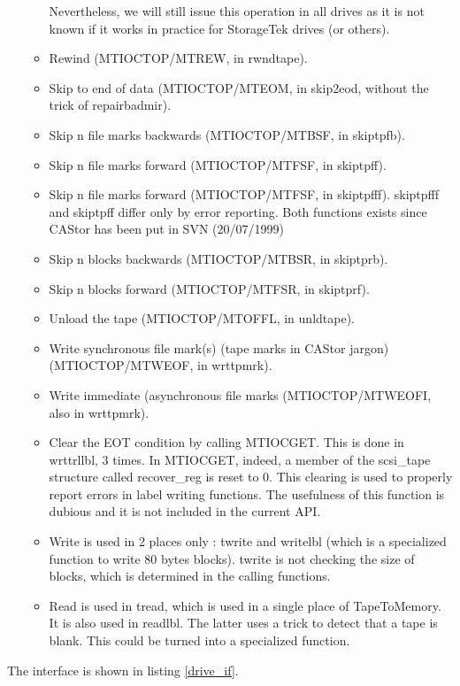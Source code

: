 \begin{itemize}
\begin{itemize}
          Nevertheless, we will still issue this operation in all drives as it is not known
          if it works in practice for StorageTek drives (or others).
    \item Rewind (MTIOCTOP/MTREW, in rwndtape).
    \item Skip to end of data (MTIOCTOP/MTEOM, in skip2eod, without the trick of repairbadmir).
    \item Skip n file marks backwards (MTIOCTOP/MTBSF, in skiptpfb).
    \item Skip n file marks forward (MTIOCTOP/MTFSF, in skiptpff).
    \item Skip n file marks forward (MTIOCTOP/MTFSF, in skiptpfff). skiptpfff and skiptpff differ only 
          by error reporting. Both functions exists since CAStor has been put in SVN (20/07/1999)
    \item Skip n blocks backwards (MTIOCTOP/MTBSR, in skiptprb).
    \item Skip n blocks forward (MTIOCTOP/MTFSR, in skiptprf).
    \item Unload the tape (MTIOCTOP/MTOFFL, in unldtape).
    \item Write synchronous file mark(s) (tape marks in CAStor jargon) (MTIOCTOP/MTWEOF, in wrttpmrk).
    \item Write immediate (asynchronous file marks (MTIOCTOP/MTWEOFI, also in wrttpmrk).
    \item Clear the EOT condition by calling MTIOCGET. This is done in wrttrllbl, 3 times.
          In MTIOCGET, indeed, a member of the scsi\_tape structure called recover\_reg is reset to 0.
          This clearing is used to properly report errors in label writing functions.
          The usefulness of this function is dubious and it is not included in the current
          API.
    \item Write is used in 2 places only : twrite and writelbl (which is a specialized 
          function to write 80 bytes blocks). twrite is not checking the size of blocks,
          which is determined in the calling functions.
    \item Read is used in tread, which is used in a single place of TapeToMemory. It is 
          also used in readlbl. The latter uses a trick to detect that a tape is blank.
          This could be turned into a specialized function.
  \end{itemize}
\end{itemize}

The interface is shown in listing \ref{drive_if}.

